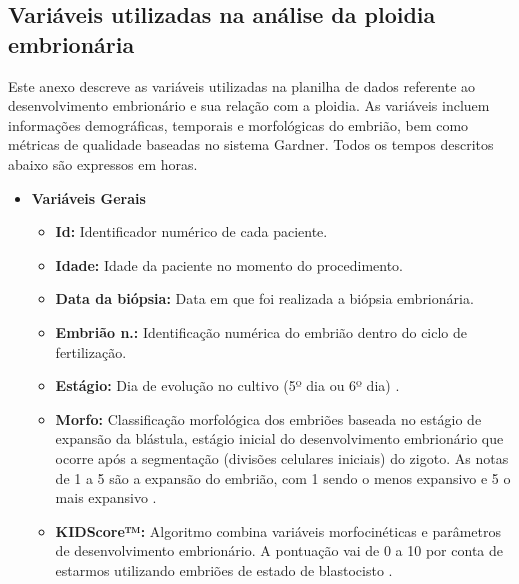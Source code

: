 \begin{apendicesenv}

\partapendices

\chapter{Variáveis utilizadas na análise da ploidia embrionária}
\label{apendice:variaveis}

Este anexo descreve as variáveis utilizadas na planilha de dados referente ao desenvolvimento embrionário e sua relação com a ploidia. As variáveis incluem informações demográficas, temporais e morfológicas do embrião, bem como métricas de qualidade baseadas no sistema Gardner. Todos os tempos descritos abaixo são expressos em horas.

\begin{itemize}
  \item \textbf{Variáveis Gerais}
  \begin{itemize}
      \item \textbf{Id:} Identificador numérico de cada paciente.
      \item \textbf{Idade:} Idade da paciente no momento do procedimento.
      \item \textbf{Data da biópsia:} Data em que foi realizada a biópsia embrionária.
      \item \textbf{Embrião n.:} Identificação numérica do embrião dentro do ciclo de fertilização.
      \item \textbf{Estágio:} Dia de evolução no cultivo (5º dia ou 6º dia) \cite{ramalho2024}.
      \item \textbf{Morfo:} Classificação morfológica dos embriões baseada no estágio de expansão da blástula, estágio inicial do desenvolvimento embrionário que ocorre após a segmentação (divisões celulares iniciais) do zigoto. As notas de 1 a 5 são a expansão do embrião, com 1 sendo o menos expansivo e 5 o mais expansivo \cite{ramalho2024}.
      \item \textbf{KIDScore™:} Algoritmo combina variáveis morfocinéticas e parâmetros de desenvolvimento embrionário. A pontuação vai de 0 a 10 por conta de estarmos utilizando embriões de estado de blastocisto \cite{gazzo2020}. 
  \end{itemize}
\end{itemize}


\end{apendicesenv}
